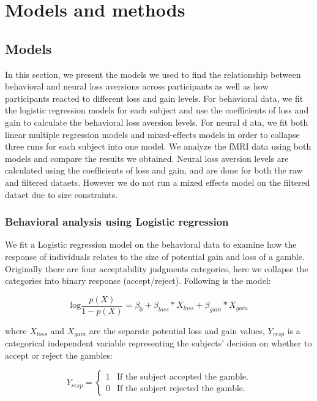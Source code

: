 \documentclass[11pt]{article}
\begin{document}
\section{Models and methods}

\subsection{Models}

In this section, we present the models we used to find the relationship between 
behavioral and neural loss aversions across participants as well as how 
participants reacted to different loss and gain levels. For behavioral data, we 
fit the logistic regression models for each subject and use the coefficients of 
loss and gain to calculate the behavioral loss aversion levels. For neural d
ata, we fit both linear multiple regression models and mixed-effects models in 
order to collapse three runs for each subject into one model. We analyze the 
fMRI data using both models and compare the results we obtained. Neural loss 
aversion levels are calculated using the coefficients of loss and gain, and 
are done for both the raw and filtered dataets. However we do not run a mixed 
effects model on the filtered dataet due to size constraints.   

\subsubsection{Behavioral analysis using Logistic regression}

We fit a Logistic regression model on the behavioral data to examine how the 
response of individuals relates to the size of potential gain and loss of a 
gamble. Originally there are four acceptability judgments categories, here we 
collapse the categories into binary response (accept/reject). 
Following is the model:

\begin{equation}
\textrm{log}\frac{p(X)}{1-p(X)} = \beta_0 + \beta_{loss} *X_{loss} + 
\beta_{gain} * X_{gain}
\end{equation}

where $X_{loss}$ and $X_{gain}$ are the separate potential loss and gain values,
$Y_{resp}$ is a categorical independent variable representing the 
subjects' decision on whether to accept or reject the gambles:

\begin{displaymath}
Y_{resp} = \left \{ \begin{array}{ll}
1 & \textrm{If the subject accepted the gamble.} \\
0 & \textrm{If the subject rejected the gamble.}
\end{array} \right .
\end{displaymath}
\end{document}
